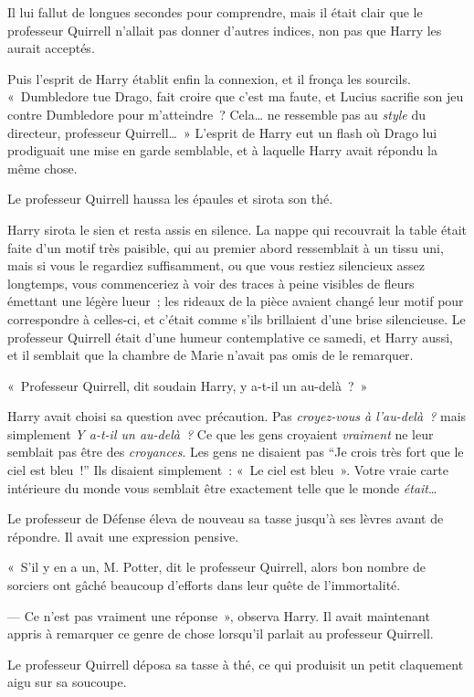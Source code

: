 Il lui fallut de longues secondes pour comprendre, mais il était clair que le professeur Quirrell n'allait pas donner d'autres indices, non pas que Harry les aurait acceptés.

Puis l'esprit de Harry établit enfin la connexion, et il fronça les sourcils.
«~Dumbledore tue Drago, fait croire que c'est ma faute, et Lucius sacrifie son jeu contre Dumbledore pour m'atteindre~?
Cela… ne ressemble pas au \emph{style} du directeur, professeur Quirrell…~»
L'esprit de Harry eut un flash où Drago lui prodiguait une mise en garde semblable, et à laquelle Harry avait répondu la même chose.

Le professeur Quirrell haussa les épaules et sirota son thé.

Harry sirota le sien et resta assis en silence.
La nappe qui recouvrait la table était faite d'un motif très paisible, qui au premier abord ressemblait à un tissu uni, mais si vous le regardiez suffisamment, ou que vous restiez silencieux assez longtemps, vous commenceriez à voir des traces à peine visibles de fleurs émettant une légère lueur~; les rideaux de la pièce avaient changé leur motif pour correspondre à celles-ci, et c'était comme s'ils brillaient d'une brise silencieuse.
Le professeur Quirrell était d'une humeur contemplative ce samedi, et Harry aussi, et il semblait que la chambre de Marie n'avait pas omis de le remarquer.

«~Professeur Quirrell, dit soudain Harry, y a-t-il un au-delà~?~»

Harry avait choisi sa question avec précaution.
Pas \emph{croyez-vous à l'au-delà~?} mais simplement \emph{Y a-t-il un au-delà~?} Ce que les gens croyaient \emph{vraiment} ne leur semblait pas être des \emph{croyances}.
Les gens ne disaient pas “Je crois très fort que le ciel est bleu~!” Ils disaient simplement~: «~Le ciel est bleu~».
Votre vraie carte intérieure du monde vous semblait être exactement telle que le monde \emph{était}…

Le professeur de Défense éleva de nouveau sa tasse jusqu'à ses lèvres avant de répondre.
Il avait une expression pensive.

«~S'il y en a un, M. Potter, dit le professeur Quirrell, alors bon nombre de sorciers ont gâché beaucoup d'efforts dans leur quête de l'immortalité.

--- Ce n'est pas vraiment une réponse~», observa Harry.
Il avait maintenant appris à remarquer ce genre de chose lorsqu'il parlait au professeur Quirrell.

Le professeur Quirrell déposa sa tasse à thé, ce qui produisit un petit claquement aigu sur sa soucoupe.

